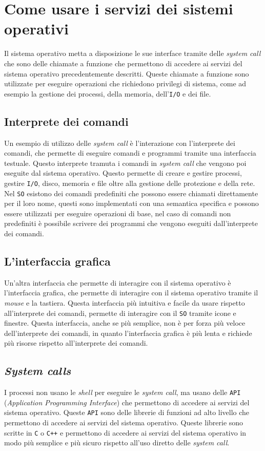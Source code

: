 \section{Come usare i servizi dei sistemi operativi}
    Il sistema operativo metta a disposizione le sue interface tramite delle \textit{system call} che sono delle chiamate a funzione che permettono di accedere ai servizi del sistema operativo precedentemente descritti. Queste chiamate a funzione sono utilizzate per eseguire operazioni che richiedono privilegi di sistema, come ad esempio la gestione dei processi, della memoria, dell'\texttt{I/O} e dei file.
    \subsection{Interprete dei comandi}
        Un esempio di utilizzo delle \textit{system call} è l'interazione con l'interprete dei comandi, che permette di eseguire comandi e programmi tramite una interfaccia testuale. Questo interprete tramuta i comandi in \textit{system call} che vengono poi eseguite dal sistema operativo. Questo permette di creare e gestire processi, gestire \texttt{I/O}, disco, memoria e file oltre alla gestione delle protezione e della rete.\newline
        Nel \texttt{SO} esistono dei comandi predefiniti che possono essere chiamati direttamente per il loro nome, questi sono implementati con una semantica specifica e possono essere utilizzati per eseguire operazioni di base, nel caso di comandi non predefiniti è possibile scrivere dei programmi che vengono eseguiti dall'interprete dei comandi.
    
    \subsection{L'interfaccia grafica}
        Un'altra interfaccia che permette di interagire con il sistema operativo è l'interfaccia grafica, che permette di interagire con il sistema operativo tramite il \textit{mouse} e la tastiera. Questa interfaccia più intuitiva e facile da usare rispetto all'interprete dei comandi, permette di interagire con il \texttt{SO} tramite icone e finestre. Questa interfaccia, anche se più semplice, non è per forza più veloce dell'interprete dei comandi, in quanto l'interfaccia grafica è più lenta e richiede più risorse rispetto all'interprete dei comandi.

    \subsection{\textit{System calls}}
        I processi non usano le \textit{shell} per eseguire le \textit{system call}, ma usano delle \texttt{API} (\textit{Application Programming Interface}) che permettono di accedere ai servizi del sistema operativo. Queste \texttt{API} sono delle librerie di funzioni ad alto livello che permettono di accedere ai servizi del sistema operativo. Queste librerie sono scritte in \texttt{C} o \texttt{C++} e permettono di accedere ai servizi del sistema operativo in modo più semplice e più sicuro rispetto all'uso diretto delle \textit{system call}.
